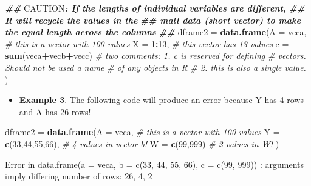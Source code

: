 \documentclass[
]{book}
\newenvironment{Shaded}{\begin{snugshade}}{\end{snugshade}}
\newcommand{\AlertTok}[1]{\textcolor[rgb]{0.94,0.16,0.16}{#1}}
\newcommand{\AttributeTok}[1]{\textcolor[rgb]{0.13,0.29,0.53}{#1}}
\newcommand{\CommentTok}[1]{\textcolor[rgb]{0.56,0.35,0.01}{\textit{#1}}}
\newcommand{\DecValTok}[1]{\textcolor[rgb]{0.00,0.00,0.81}{#1}}
\newcommand{\DocumentationTok}[1]{\textcolor[rgb]{0.56,0.35,0.01}{\textbf{\textit{#1}}}}
\newcommand{\FunctionTok}[1]{\textcolor[rgb]{0.13,0.29,0.53}{\textbf{#1}}}
\newcommand{\NormalTok}[1]{#1}
\newcommand{\OtherTok}[1]{\textcolor[rgb]{0.56,0.35,0.01}{#1}}
\newcommand{\SpecialCharTok}[1]{\textcolor[rgb]{0.81,0.36,0.00}{\textbf{#1}}}
\providecommand{\tightlist}{%
  \setlength{\itemsep}{0pt}\setlength{\parskip}{0pt}}
\begin{document}
\begin{Shaded}
\begin{Highlighting}[]
\DocumentationTok{\#\# }\AlertTok{CAUTION}\DocumentationTok{: If the lengths of individual variables are different, }
\DocumentationTok{\#\# R will recycle the values in the }
\DocumentationTok{\#\#  mall data (short vector) to make the equal length across the columns}
\DocumentationTok{\#\#}
\NormalTok{dframe2 }\OtherTok{=} \FunctionTok{data.frame}\NormalTok{(}\AttributeTok{A =}\NormalTok{ veca,            }\CommentTok{\# this is a vector with 100 values}
                     \AttributeTok{X =} \DecValTok{1}\SpecialCharTok{:}\DecValTok{13}\NormalTok{,            }\CommentTok{\# this vector has 13 values}
                     \AttributeTok{c =} \FunctionTok{sum}\NormalTok{(veca}\SpecialCharTok{+}\NormalTok{vecb}\SpecialCharTok{+}\NormalTok{vecc)    }
                                  \CommentTok{\# two comments: 1. c is reserved for defining}
                                  \CommentTok{\# vectors. Should not be used a name  }
                                  \CommentTok{\# of any objects in R}
                                  \CommentTok{\# 2. this is also a single value.}
\NormalTok{  )}
\end{Highlighting}
\end{Shaded}

\begin{itemize}
\tightlist
\item
  \textbf{Example 3}. The following code will produce an error because Y has 4 rows and A has 26 rows!
\end{itemize}

\begin{Shaded}
\begin{Highlighting}[]
\NormalTok{dframe2 }\OtherTok{=} \FunctionTok{data.frame}\NormalTok{(}\AttributeTok{A =}\NormalTok{ veca,             }\CommentTok{\# this is a vector with 100 values}
                     \AttributeTok{Y =} \FunctionTok{c}\NormalTok{(}\DecValTok{33}\NormalTok{,}\DecValTok{44}\NormalTok{,}\DecValTok{55}\NormalTok{,}\DecValTok{66}\NormalTok{),   }\CommentTok{\#  4 values in vector b!}
                     \AttributeTok{W =} \FunctionTok{c}\NormalTok{(}\DecValTok{99}\NormalTok{,}\DecValTok{999}\NormalTok{)         }\CommentTok{\#  2 values in W!}
\NormalTok{)}
\end{Highlighting}
\end{Shaded}

Error in data.frame(a = veca, b = c(33, 44, 55, 66), c = c(99, 999)) : arguments imply differing number of rows: 26, 4, 2
\end{document}
